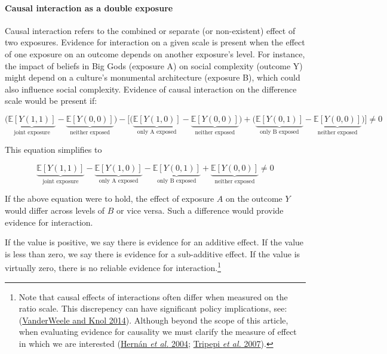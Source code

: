 \documentclass[
  singlecolumn]{article}
\let\oldparagraph\paragraph
\renewcommand{\paragraph}[1]{\oldparagraph{#1}\mbox{}}
\begin{document}
\hypertarget{causal-interaction-as-a-double-exposure}{%
\paragraph{\texorpdfstring{\textbf{Causal interaction as a double
exposure}}{Causal interaction as a double exposure}}\label{causal-interaction-as-a-double-exposure}}

Causal interaction refers to the combined or separate (or non-existent)
effect of two exposures. Evidence for interaction on a given scale is
present when the effect of one exposure on an outcome depends on another
exposure's level. For instance, the impact of beliefs in Big Gods
(exposure A) on social complexity (outcome Y) might depend on a
culture's monumental architecture (exposure B), which could also
influence social complexity. Evidence of causal interaction on the
difference scale would be present if:

\[\bigg(\underbrace{\mathbb{E}[Y(1,1)]}_{\text{joint exposure}} - \underbrace{\mathbb{E}[Y(0,0)]}_{\text{neither exposed}}\bigg) - \bigg[ \bigg(\underbrace{\mathbb{E}[Y(1,0)]}_{\text{only A exposed}} - \underbrace{\mathbb{E}[Y(0,0)]}_{\text{neither exposed}}\bigg) + \bigg(\underbrace{\mathbb{E}[Y(0,1)]}_{\text{only B exposed}} - \underbrace{\mathbb{E}[Y(0,0)]}_{\text{neither exposed}} \bigg)\bigg] \neq 0 \]

This equation simplifies to

\[ \underbrace{\mathbb{E}[Y(1,1)]}_{\text{joint exposure}} - \underbrace{\mathbb{E}[Y(1,0)]}_{\text{only A exposed}} - \underbrace{\mathbb{E}[Y(0,1)]}_{\text{only B exposed}} + \underbrace{\mathbb{E}[Y(0,0)]}_{\text{neither exposed}} \neq 0 \]

If the above equation were to hold, the effect of exposure \(A\) on the
outcome \(Y\) would differ across levels of \(B\) or vice versa. Such a
difference would provide evidence for interaction.

If the value is positive, we say there is evidence for an additive
effect. If the value is less than zero, we say there is evidence for a
sub-additive effect. If the value is virtually zero, there is no
reliable evidence for interaction.\footnote{Note that causal effects of
  interactions often differ when measured on the ratio scale. This
  discrepency can have significant policy implications, see:
  (\protect\hyperlink{ref-vanderweele2014}{VanderWeele and Knol 2014}).
  Although beyond the scope of this article, when evaluating evidence
  for causality we must clarify the measure of effect in which we are
  interested (\protect\hyperlink{ref-hernuxe1n2004}{Hernán \emph{et al.}
  2004}; \protect\hyperlink{ref-tripepi2007}{Tripepi \emph{et al.}
  2007}).}
\end{document}
